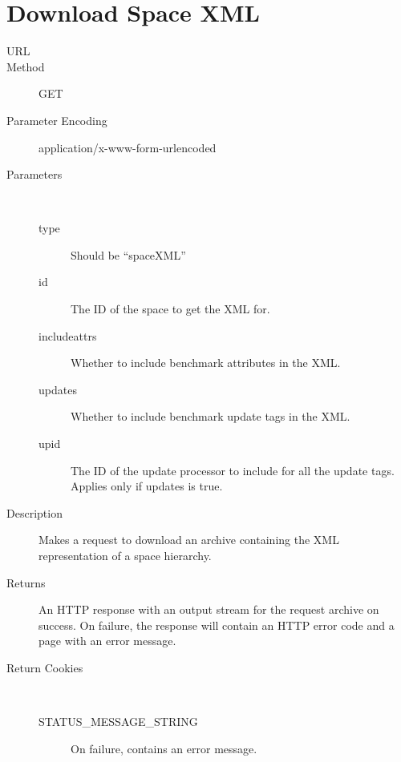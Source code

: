 \section{Download Space XML}
\begin{description}
\item [URL] 
\item [Method] GET
\item [Parameter Encoding] application/x-www-form-urlencoded
\item [Parameters] \
	\begin{description}
	\item [type]  Should be ``spaceXML''
	\item [id]  The ID of the space to get the XML for.
	\item [includeattrs]  Whether to include benchmark attributes in the XML.
	\item [updates] \type{Boolean} Whether to include benchmark update tags in the XML.
	\item [upid] \type{Integer} The ID of the update processor to include for all the update tags. Applies only if updates is true.
	\end{description}
\item [Description] Makes a request to download an archive containing the XML representation of a space hierarchy.
\item [Returns] An HTTP response with an output stream for the request archive on success. On failure, the response will contain an HTTP error code and a page with an error message.
\item [Return Cookies] \
	\begin{description}
	\item [STATUS\_MESSAGE\_STRING]  On failure, contains an error message.
	\end{description}
\end{description}

